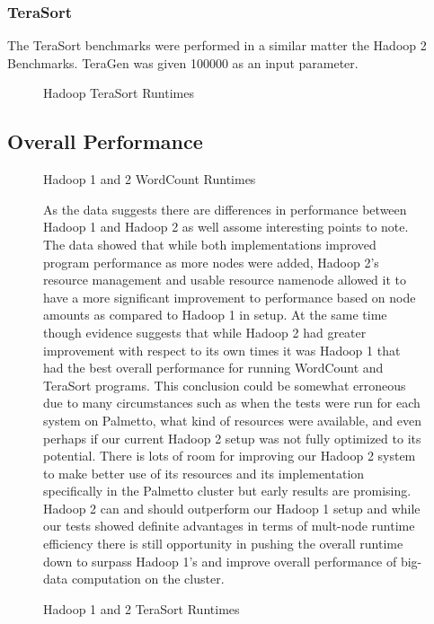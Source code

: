 \documentclass[conference]{IEEEtran}
\begin{document}
					\subsubsection{TeraSort}
						The TeraSort benchmarks were performed in a similar matter the Hadoop 2 Benchmarks. TeraGen was given 100000 as an input parameter.
						\begin{figure}[h]
                   					\begin{center}
                        						\caption{Hadoop TeraSort Runtimes}
                    				\end{center}
                  			\end{figure}
				\subsection{Overall Performance}
						\begin{figure}[h]
                   					\begin{center}
                       						
                        						\caption{Hadoop 1 and 2 WordCount Runtimes}
                    					\end{center}
						\end{figure}
						\begin{figure}[h]
                   					\begin{center}
                        					\caption{Hadoop 1 and 2 TeraSort Runtimes}
                    				\end{center}

						As the data suggests there are differences in performance between Hadoop 1 and Hadoop 2 as well assome interesting points to note. The data showed that while both implementations improved program performance as more nodes were added, Hadoop 2’s resource management and usable resource namenode allowed it to have a more significant improvement to performance based on node amounts as compared to Hadoop 1 in setup. At the same time though evidence suggests that while Hadoop 2 had greater improvement with respect to its own times it was Hadoop 1 that had the best overall performance for running WordCount and TeraSort programs. This conclusion could be somewhat erroneous due to many circumstances such as when the tests were run for each system on Palmetto, what kind of resources were available, and even perhaps if our current Hadoop 2 setup was not fully optimized to its potential. There is lots of room for improving our Hadoop 2 system to make better use of its resources and its implementation specifically in the Palmetto cluster but early results are promising. Hadoop 2 can and should outperform our Hadoop 1 setup and while our tests showed definite advantages in terms of mult-node runtime efficiency there is still opportunity in pushing the overall runtime down to surpass Hadoop 1’s and improve overall performance of big-data computation on the cluster.
                  			\end{figure}
\end{document}

